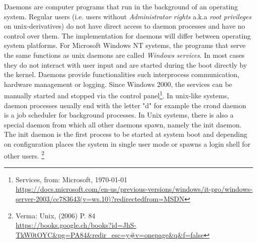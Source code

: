 Daemons are computer programs that run in the background of an operating system. Regular users (i.e. users without \textit{Administrator rights} a.k.a \textit{root privileges} on unix-derivatives)
do not have direct access to daemon processes and have no control over them. The implementation for daemons will differ between
operating system platforms. For Microsoft Windows NT systems, the programs that serve the same functions as 
unix daemons are called \textit{Windows services}. In most cases they do not interact with user input and are started 
during the boot directly by the kernel.
Daemons provide functionalities such interprocess communication, hardware management or logging. 
Since Windows 2000, the services can be manually started and stopped via the control panel\footnote{Services, from: Microsoft, \today \\ \url{https://docs.microsoft.com/en-us/previous-versions/windows/it-pro/windows-server-2003/cc783643(v=ws.10)?redirectedfrom=MSDN}}.
In unix-like systems, daemon processes usually end with the letter "d" for example the crond daemon is 
a job scheduler for background processes. In Unix systems, there is also a special daemon from which all
other daemons spawn, namely the init daemon. The init daemon is the first process to be started at system boot 
and depending on configuration places the system in single user mode or spawns a login shell for other users. \footnote{Verma: Unix, (2006) P. 84 \\ \url{https://books.google.ch/books?id=JhS-TkW0tOYC&pg=PA84&redir_esc=y#v=onepage&q&f=false}}




















